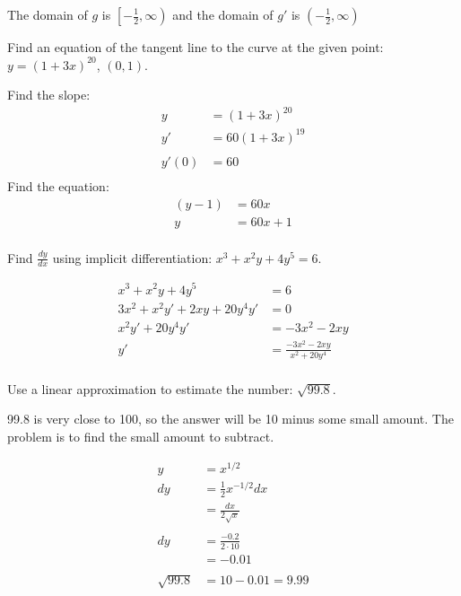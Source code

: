\documentclass[fleqn,addpoints]{exam}
\begin{document}
\begin{questions}
\begin{solution}
The domain of $g$ is $\left[-\frac{1}{2}, \infty \right)$ and the domain of $g'$ is $\left( -\frac{1}{2}, \infty \right)$

\end{solution}

\ifprintanswers
\pagebreak
\fi

\question Find an equation of the tangent line to the curve at the given point: $y = (1 + 3x)^{20}$, $(0, 1)$.
\begin{solution}

Find the slope:
\begin{align*}
  y &= (1 + 3x)^{20} \\
  y' &= 60 (1 + 3x)^{19} \\
\\
  y'(0) &= 60 \\
\end{align*}
Find the equation:
\begin{align*}
  (y - 1) &= 60x \\
  y &= 60x + 1 \\
\end{align*}

\end{solution}

\question Find $\frac{dy}{dx}$ using implicit differentiation: $x^3 + x^2y + 4y^5 = 6$.
\begin{solution}

\begin{align*}
  x^3 + x^2y + 4y^5 &= 6 \\
  3x^2 + x^2y' + 2xy + 20y^4y' &= 0 \\
   x^2y' + 20y^4y' &= -3x^2 - 2xy \\
   y' &= \frac{-3x^2 - 2xy}{x^2 + 20y^4} \\
\end{align*}

\end{solution}

\ifprintanswers
\pagebreak
\fi

\question Use a linear approximation to estimate the number: $\sqrt{99.8}$.

\begin{solution}
  99.8 is very close to 100, so the answer will be 10 minus some small amount.  The problem is to find the small amount to subtract.

\begin{align*}
  y &= x^{1/2} \\
  dy &= \frac{1}{2} x^{-1/2} dx \\
     &= \frac{dx}{2 \sqrt{x}} \\
\\
  dy &= \frac{- 0.2}{2 \cdot 10} \\
     &= -0.01 \\
\\
  \sqrt{99.8} &= 10 - 0.01 = 9.99 \\
\end{align*}


\end{solution}
\end{questions}
\end{document}

